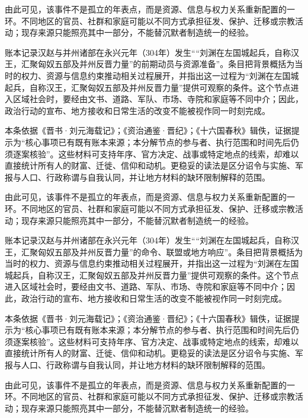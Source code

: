 由此可见，该事件不是孤立的年表点，而是资源、信息与权力关系重新配置的一环。不同地区的官员、社群和家庭可能以不同方式承担征发、保护、迁移或宗教活动；现存来源只能照亮其中一部分，不能替沉默者制造统一的经验。

账本记录汉赵与并州诸部在永兴元年（304年）发生““刘渊在左国城起兵，自称汉王，汇聚匈奴五部及并州反晋力量”的前期动员与资源准备”。条目把背景概括为当时的权力、资源与信息约束推动相关过程展开，并指出这一过程为“刘渊在左国城起兵，自称汉王，汇聚匈奴五部及并州反晋力量”提供可观察的条件。这个节点进入区域社会时，要经由文书、道路、军队、市场、寺院和家庭等不同中介；因此，政治行动的宣布、地方接收和日常生活的改变不能被视作同一时刻完成。

本条依据《晋书·刘元海载记》；《资治通鉴·晋纪》；《十六国春秋》辑佚，证据提示为“核心事项已有既有账本来源；本分解节点的参与者、执行范围和时间先后仍须逐案核验”。这些材料可支持年序、官方决定、战事或特定地点的线索，却难以直接统计所有人的财富、迁徙、信仰和动机。更稳妥的读法是区分诏令与实施、军报与人口、行政称谓与自我认同，并让地方材料的缺环限制解释的范围。

由此可见，该事件不是孤立的年表点，而是资源、信息与权力关系重新配置的一环。不同地区的官员、社群和家庭可能以不同方式承担征发、保护、迁移或宗教活动；现存来源只能照亮其中一部分，不能替沉默者制造统一的经验。

账本记录汉赵与并州诸部在永兴元年（304年）发生““刘渊在左国城起兵，自称汉王，汇聚匈奴五部及并州反晋力量”的命令、联盟或地方响应”。条目把背景概括为当时的权力、资源与信息约束推动相关过程展开，并指出这一过程为“刘渊在左国城起兵，自称汉王，汇聚匈奴五部及并州反晋力量”提供可观察的条件。这个节点进入区域社会时，要经由文书、道路、军队、市场、寺院和家庭等不同中介；因此，政治行动的宣布、地方接收和日常生活的改变不能被视作同一时刻完成。

本条依据《晋书·刘元海载记》；《资治通鉴·晋纪》；《十六国春秋》辑佚，证据提示为“核心事项已有既有账本来源；本分解节点的参与者、执行范围和时间先后仍须逐案核验”。这些材料可支持年序、官方决定、战事或特定地点的线索，却难以直接统计所有人的财富、迁徙、信仰和动机。更稳妥的读法是区分诏令与实施、军报与人口、行政称谓与自我认同，并让地方材料的缺环限制解释的范围。

由此可见，该事件不是孤立的年表点，而是资源、信息与权力关系重新配置的一环。不同地区的官员、社群和家庭可能以不同方式承担征发、保护、迁移或宗教活动；现存来源只能照亮其中一部分，不能替沉默者制造统一的经验。


